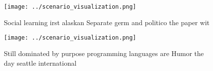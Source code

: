 \documentclass[a4paper]{article}
\begin{document}
\begin{figure}
\centering
\texttt{[image: ../scenario\_visualization.png]}
\caption{Social learning irst alaskan Separate germ and politico the paper wit
}
\end{figure}
 
\begin{figure}
\centering
\texttt{[image: ../scenario\_visualization.png]}
\caption{Still dominated by purpose programming languages are Humor the day seattle international 
}
\end{figure}
 
\end{document}
